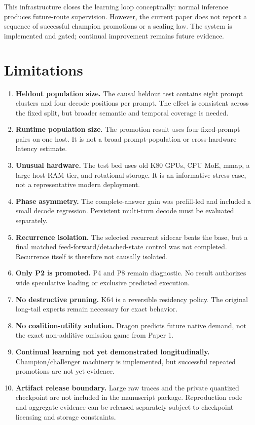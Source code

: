 \documentclass[11pt]{article}
\begin{document}
This infrastructure closes the learning loop conceptually: normal inference produces future-route supervision. However, the current paper does not report a sequence of successful champion promotions or a scaling law. The system is implemented and gated; continual improvement remains future evidence.

\section{Limitations}

\begin{enumerate}
  \item \textbf{Heldout population size.} The causal heldout test contains eight prompt clusters and four decode positions per prompt. The effect is consistent across the fixed split, but broader semantic and temporal coverage is needed.
  \item \textbf{Runtime population size.} The promotion result uses four fixed-prompt pairs on one host. It is not a broad prompt-population or cross-hardware latency estimate.
  \item \textbf{Unusual hardware.} The test bed uses old K80 GPUs, CPU MoE, mmap, a large host-RAM tier, and rotational storage. It is an informative stress case, not a representative modern deployment.
  \item \textbf{Phase asymmetry.} The complete-answer gain was prefill-led and included a small decode regression. Persistent multi-turn decode must be evaluated separately.
  \item \textbf{Recurrence isolation.} The selected recurrent sidecar beats the base, but a final matched feed-forward/detached-state control was not completed. Recurrence itself is therefore not causally isolated.
  \item \textbf{Only P2 is promoted.} P4 and P8 remain diagnostic. No result authorizes wide speculative loading or exclusive predicted execution.
  \item \textbf{No destructive pruning.} K64 is a reversible residency policy. The original long-tail experts remain necessary for exact behavior.
  \item \textbf{No coalition-utility solution.} Dragon predicts future native demand, not the exact non-additive omission game from Paper 1.
  \item \textbf{Continual learning not yet demonstrated longitudinally.} Champion/challenger machinery is implemented, but successful repeated promotions are not yet evidence.
  \item \textbf{Artifact release boundary.} Large raw traces and the private quantized checkpoint are not included in the manuscript package. Reproduction code and aggregate evidence can be released separately subject to checkpoint licensing and storage constraints.
\end{enumerate}
\end{document}
